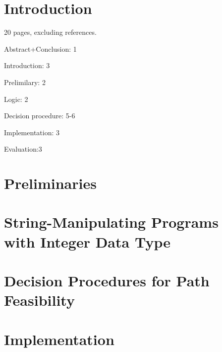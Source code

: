 \documentclass{llncs}
\begin{document}
\section{Introduction}

20 pages, excluding references.

Abstract+Conclusion: 1

Introduction: 3

Prelimilary: 2

Logic: 2

Decision procedure: 5-6

Implementation: 3

Evaluation:3




\section{Preliminaries}\label{sec:prel}




\section{String-Manipulating Programs with Integer Data Type}\label{sec:logic}





%


\section{Decision Procedures for Path Feasibility}\label{sec:dec}




\section{Implementation}
\end{document}
